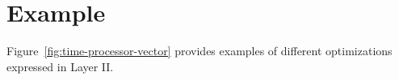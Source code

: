 

\section{Example}

Figure~\ref{fig:time-processor-vector} provides examples of different optimizations expressed in Layer II.

